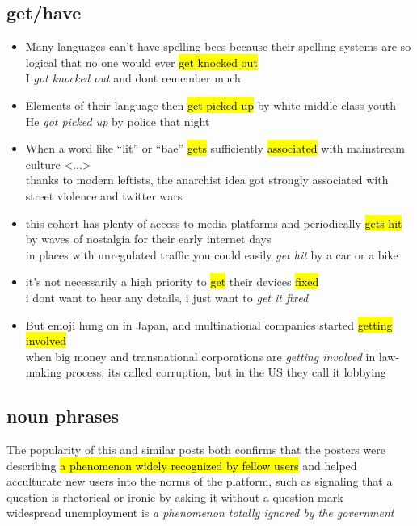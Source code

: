 \documentclass[
]{article}
\providecommand{\tightlist}{%
  \setlength{\itemsep}{0pt}\setlength{\parskip}{0pt}}
\begin{document}
\subsection{get/have}\label{gethave}

\begin{itemize}
\tightlist
\item
  Many languages can't have spelling bees because their spelling systems
  are so logical that no one would ever \hl{get knocked out}\\
  I \emph{got knocked out} and don\textquotesingle t remember much
\item
  Elements of their language then \hl{get picked up} by white
  middle-class youth\\
  He \emph{got picked up} by police that night
\item
  When a word like ``lit'' or ``bae'' \hl{gets} sufficiently
  \hl{associated} with mainstream culture \textless...\textgreater{}\\
  thanks to modern leftists, the anarchist idea got strongly associated
  with street violence and \textquotesingle twitter
  wars\textquotesingle{}
\item
  this cohort has plenty of access to media platforms and periodically
  \hl{gets hit} by waves of nostalgia for their early internet days\\
  in places with unregulated traffic you could easily \emph{get hit} by
  a car or a bike
\item
  it's not necessarily a high priority to \hl{get} their devices
  \hl{fixed}\\
  i don\textquotesingle t want to hear any details, i just want to
  \emph{get it fixed}
\item
  But emoji hung on in Japan, and multinational companies started
  \hl{getting involved}\\
  when big money and transnational corporations are \emph{getting
  involved} in law-making process, it\textquotesingle s called
  \textquotesingle corruption\textquotesingle, but in the US they call
  it \textquotesingle lobbying\textquotesingle{}
\end{itemize}

\subsection{noun phrases}\label{noun-phrases}

The popularity of this and similar posts both confirms that the posters
were describing \hl{a phenomenon widely recognized by fellow users} and
helped acculturate new users into the norms of the platform, such as
signaling that a question is rhetorical or ironic by asking it without a
question mark\\
widespread unemployment is \emph{a phenomenon totally ignored by the
government}
\end{document}
